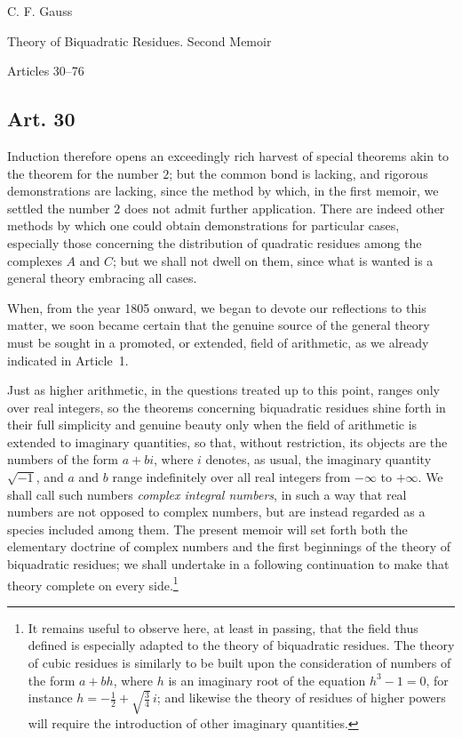 \documentclass[12pt]{article}
\newcommand{\art}[1]{\subsection*{Art. #1}}
\begin{document}
\begin{center}
{\Large C. F. Gauss}\par
{\large Theory of Biquadratic Residues. Second Memoir}\par
{\large Articles 30--76}
\end{center}

\art{30}

Induction therefore opens an exceedingly rich harvest of special theorems akin to the theorem for the number $2$; but the common bond is lacking, and rigorous demonstrations are lacking, since the method by which, in the first memoir, we settled the number $2$ does not admit further application. There are indeed other methods by which one could obtain demonstrations for particular cases, especially those concerning the distribution of quadratic residues among the complexes $A$ and $C$; but we shall not dwell on them, since what is wanted is a general theory embracing all cases.

When, from the year 1805 onward, we began to devote our reflections to this matter, we soon became certain that the genuine source of the general theory must be sought in a promoted, or extended, field of arithmetic, as we already indicated in Article~1.

Just as higher arithmetic, in the questions treated up to this point, ranges only over real integers, so the theorems concerning biquadratic residues shine forth in their full simplicity and genuine beauty only when the field of arithmetic is extended to imaginary quantities, so that, without restriction, its objects are the numbers of the form $a+bi$, where $i$ denotes, as usual, the imaginary quantity $\sqrt{-1}$, and $a$ and $b$ range indefinitely over all real integers from $-\infty$ to $+\infty$. We shall call such numbers \textit{complex integral numbers}, in such a way that real numbers are not opposed to complex numbers, but are instead regarded as a species included among them. The present memoir will set forth both the elementary doctrine of complex numbers and the first beginnings of the theory of biquadratic residues; we shall undertake in a following continuation to make that theory complete on every side.\footnote{It remains useful to observe here, at least in passing, that the field thus defined is especially adapted to the theory of biquadratic residues. The theory of cubic residues is similarly to be built upon the consideration of numbers of the form $a+bh$, where $h$ is an imaginary root of the equation $h^3-1=0$, for instance $h=-\frac{1}{2}+\sqrt{\frac{3}{4}}\,i$; and likewise the theory of residues of higher powers will require the introduction of other imaginary quantities.}
\end{document}
